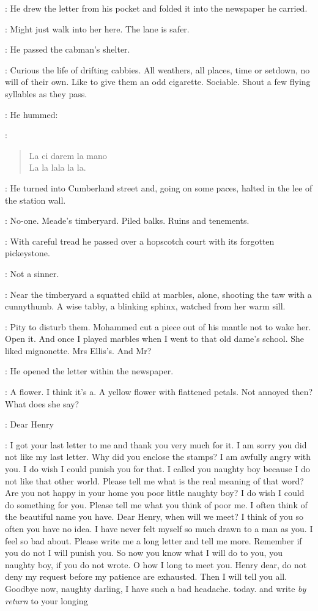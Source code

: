 :
He drew the letter from his pocket
and folded it into the newspaper he carried.

\BloomInt:
Might just walk into her here.
The lane is safer.

:
He passed the cabman's shelter.

\BloomInt:
Curious the life of drifting cabbies.
All weathers, all places,
time or setdown,
no will of their own.
Like to give them an odd cigarette.
Sociable.
Shout a few flying syllables as they pass.

:
He hummed:

\BloomInt:
\begin{verse}
    La ci darem la mano \\
    La la lala la la.
\end{verse}

:
He turned into Cumberland street
and, going on some paces,
halted in the lee of the station wall.

\BloomInt:
No-one.
Meade's timberyard.
Piled balks.
Ruins and tenements.

:
With careful tread
he passed over a hopscotch court with its forgotten pickeystone.

\BloomInt:
Not a sinner.

:
Near the timberyard a squatted child at marbles,
alone,
shooting the taw with a cunnythumb.
A wise tabby, a blinking sphinx,
watched from her warm sill.

\BloomInt:
Pity to disturb them.
Mohammed cut a piece out of his mantle not to wake her.
Open it.
And once I played marbles when I went to that old dame's school.
She liked mignonette.
Mrs Ellis's.
And Mr?

:
He opened the letter within the newspaper.

\BloomInt:
A flower.
I think it's a.
A yellow flower with flattened petals.
Not annoyed then?
What does she say?

\martha:
Dear Henry

\martha:
I got your last letter to me and thank you very much for it.
I am sorry you did not like my last letter.
Why did you enclose the stamps?
I am awfully angry with you.
I do wish I could punish you for that.
I called you naughty boy
because I do not like that other world.
Please tell me what is the real meaning of that word?
Are you not happy in your home
you poor little naughty boy?
I do wish I could do something for you.
Please tell me what you think of poor me.
I often think of the beautiful name you have.
Dear Henry,
when will we meet?
I think of you so often
you have no idea.
I have never felt myself so much drawn to a man as you.
I feel so bad about.
Please write me a long letter and tell me more.
Remember if you do not
I will punish you.
So now you know what I will do to you,
you naughty boy, if you do not wrote.
O how I long to meet you.
Henry dear, do not deny my request before my patience are exhausted.
Then I will tell you all.
Goodbye now, naughty darling,
I have such a bad headache.
today.
and write \emph{by return} to your longing

